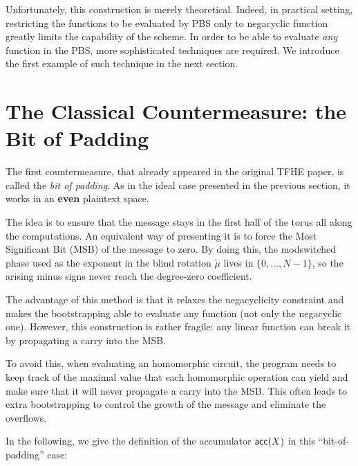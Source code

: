 Unfortunately, this construction is merely theoretical. Indeed, in practical setting, restricting the functions to be evaluated by PBS only to negacyclic function greatly limits the capability of the scheme. In order to be able to evaluate \textit{any} function in the PBS, more sophisticated techniques are required. We introduce the first example of such technique in the next section.


\section{The Classical Countermeasure: the Bit of Padding}
\label{sec:bit_of_padding}

The first countermeasure, that already appeared in the original TFHE paper, is called the \textit{bit of padding}. As in the ideal case presented in the previous section, it works in an \textbf{even} plaintext space.

The idea is to ensure that the message stays in the first half of the torus all along the computations. An equivalent way of presenting it is to force the Most Significant Bit (MSB) of the message to zero. By doing this, the modswitched phase used as the exponent in the blind rotation $\tilde{\mu}$ lives in $\{0, \dots, N - 1\}$, so the arising minus signs never reach the degree-zero coefficient.

The advantage of this method is that it relaxes the negacyclicity constraint and makes the bootstrapping able to evaluate any function (not only the negacyclic one). However, this construction is rather fragile: any linear function can break it by propagating a carry into the MSB. 

To avoid this, when evaluating an homomorphic circuit, the program needs to keep track of the maximal value that each homomorphic operation can yield and make sure that it will never propagate a carry into the MSB. This often leads to extra bootstrapping to control the growth of the message and eliminate the overflows. 


In the following, we give the definition of the accumulator $\textsf{acc}(X)$ in this ``bit-of-padding'' case:


